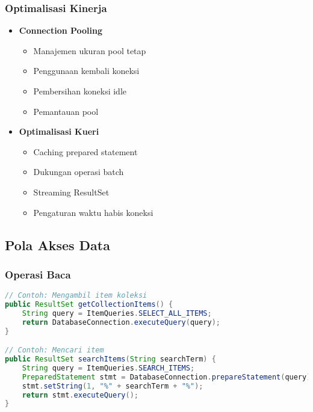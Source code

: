 \documentclass[12pt,a4paper]{article}
\begin{document}
\subsubsection{Optimalisasi Kinerja}
\begin{itemize}
    \item \textbf{Connection Pooling}
    \begin{itemize}
        \item Manajemen ukuran pool tetap
        \item Penggunaan kembali koneksi
        \item Pembersihan koneksi idle
        \item Pemantauan pool
    \end{itemize}
    
    \item \textbf{Optimalisasi Kueri}
    \begin{itemize}
        \item Caching prepared statement
        \item Dukungan operasi batch
        \item Streaming ResultSet
        \item Pengaturan waktu habis koneksi
    \end{itemize}
\end{itemize}

\subsection{Pola Akses Data}

\subsubsection{Operasi Baca}
\begin{lstlisting}[language=Java]
// Contoh: Mengambil item koleksi
public ResultSet getCollectionItems() {
    String query = ItemQueries.SELECT_ALL_ITEMS;
    return DatabaseConnection.executeQuery(query);
}

// Contoh: Mencari item
public ResultSet searchItems(String searchTerm) {
    String query = ItemQueries.SEARCH_ITEMS;
    PreparedStatement stmt = DatabaseConnection.prepareStatement(query);
    stmt.setString(1, "%" + searchTerm + "%");
    return stmt.executeQuery();
}
\end{lstlisting}
\end{document}
